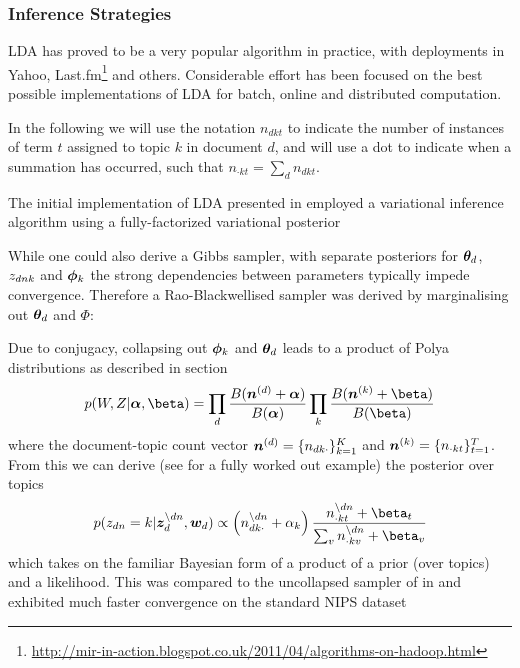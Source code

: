 

\subsubsection{Inference Strategies}
LDA has proved to be a very popular algorithm in practice, with deployments in Yahoo\cite{Ahmed2011a}, Last.fm\footnote{\url{http://mir-in-action.blogspot.co.uk/2011/04/algorithms-on-hadoop.html}} and others. Considerable effort has been focused on the best possible implementations of LDA for batch, online and distributed computation.

In the following we will use the notation $n_{dkt}$ to indicate the number of instances of term $t$ assigned to topic $k$ in document $d$, and will use a dot to indicate when a summation has occurred, such that $n_{\cdot k t} = \sum_d n_{dkt}$.



The initial implementation of LDA presented in \cite{BleiNgJordan2003} employed a variational inference algorithm using a fully-factorized variational posterior

While one could also derive a Gibbs sampler, with separate posteriors for ${ \bm \theta_d }$, ${ z_{dnk} }$ and ${ \bm \phi_k }$ \cite{Pritchard2000} the strong dependencies between parameters typically impede convergence\cite{CasellaRobert1999}. Therefore \cite{Griffiths2004} a Rao-Blackwellised sampler was derived by marginalising out ${ \bm \theta_d }$ and $\Phi$:

Due to conjugacy, collapsing out ${ \bm \phi_k }$ and ${ \bm \theta_d }$ leads to a product of P\:olya distributions as described in section\begin{align}
p(W,Z|\vv{\alpha},\vv{\beta}) = \prod_d \frac{B(\vv{n}^{(d)} + \vv{\alpha})}{B(\vv{\alpha})} \prod_k \frac{B(\vv{n}^{(k)} + \vv{\beta})}{B(\vv{\beta})}
\end{align}
where the document-topic count vector $\bm n^{(d)} = \{ n_{dk\cdot} \}_{k=1}^K$ and $\bm n^{(k)} = \{ n_{\cdot kt} \}_{t=1}^T$. From this we can derive (see \cite{Heinrich2005} for a fully worked out example) the posterior over topics
\begin{align}
p(z_{dn} = k | \vv{z}_{d}^{\setminus dn}, \vv{w}_d)
\propto
\left(n_{dk\cdot}^{\setminus dn} + \alpha_k \right)
\frac{n_{\cdot kt}^{\setminus dn} + \beta_t}{\sum_v n_{\cdot kv}^{\setminus dn} + \beta_v}
\end{align}
which takes on the familiar Bayesian form of a product of a prior (over topics) and a likelihood. This was compared to the uncollapsed sampler of \cite{Pritchard2000} in \cite{Newman2009} and exhibited much faster convergence on the standard NIPS dataset

